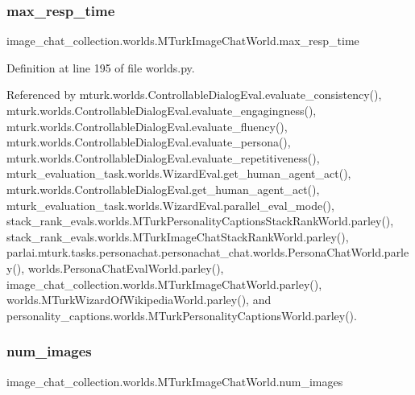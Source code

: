 \subsubsection{\texorpdfstring{max\+\_\+resp\+\_\+time}{max\_resp\_time}}
{\footnotesize\ttfamily image\+\_\+chat\+\_\+collection.\+worlds.\+M\+Turk\+Image\+Chat\+World.\+max\+\_\+resp\+\_\+time}



Definition at line 195 of file worlds.\+py.



Referenced by mturk.\+worlds.\+Controllable\+Dialog\+Eval.\+evaluate\+\_\+consistency(), mturk.\+worlds.\+Controllable\+Dialog\+Eval.\+evaluate\+\_\+engagingness(), mturk.\+worlds.\+Controllable\+Dialog\+Eval.\+evaluate\+\_\+fluency(), mturk.\+worlds.\+Controllable\+Dialog\+Eval.\+evaluate\+\_\+persona(), mturk.\+worlds.\+Controllable\+Dialog\+Eval.\+evaluate\+\_\+repetitiveness(), mturk\+\_\+evaluation\+\_\+task.\+worlds.\+Wizard\+Eval.\+get\+\_\+human\+\_\+agent\+\_\+act(), mturk.\+worlds.\+Controllable\+Dialog\+Eval.\+get\+\_\+human\+\_\+agent\+\_\+act(), mturk\+\_\+evaluation\+\_\+task.\+worlds.\+Wizard\+Eval.\+parallel\+\_\+eval\+\_\+mode(), stack\+\_\+rank\+\_\+evals.\+worlds.\+M\+Turk\+Personality\+Captions\+Stack\+Rank\+World.\+parley(), stack\+\_\+rank\+\_\+evals.\+worlds.\+M\+Turk\+Image\+Chat\+Stack\+Rank\+World.\+parley(), parlai.\+mturk.\+tasks.\+personachat.\+personachat\+\_\+chat.\+worlds.\+Persona\+Chat\+World.\+parley(), worlds.\+Persona\+Chat\+Eval\+World.\+parley(), image\+\_\+chat\+\_\+collection.\+worlds.\+M\+Turk\+Image\+Chat\+World.\+parley(), worlds.\+M\+Turk\+Wizard\+Of\+Wikipedia\+World.\+parley(), and personality\+\_\+captions.\+worlds.\+M\+Turk\+Personality\+Captions\+World.\+parley().

\mbox{\label{classimage__chat__collection_1_1worlds_1_1MTurkImageChatWorld_adf323947082f426bc1f082e4bde387c6}} 
\subsubsection{\texorpdfstring{num\+\_\+images}{num\_images}}
{\footnotesize\ttfamily image\+\_\+chat\+\_\+collection.\+worlds.\+M\+Turk\+Image\+Chat\+World.\+num\+\_\+images}



